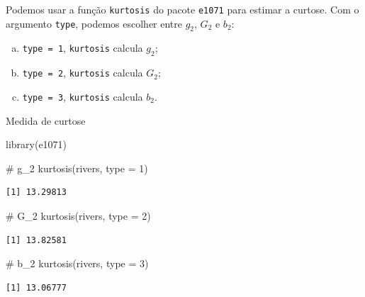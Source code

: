 \documentclass[
  10pt,
  ignorenonframetext,
]{beamer}
\newenvironment{Shaded}{\begin{snugshade}}{\end{snugshade}}
\newcommand{\AttributeTok}[1]{\textcolor[rgb]{0.40,0.45,0.13}{#1}}
\newcommand{\CommentTok}[1]{\textcolor[rgb]{0.37,0.37,0.37}{#1}}
\newcommand{\DecValTok}[1]{\textcolor[rgb]{0.68,0.00,0.00}{#1}}
\newcommand{\FunctionTok}[1]{\textcolor[rgb]{0.28,0.35,0.67}{#1}}
\newcommand{\NormalTok}[1]{\textcolor[rgb]{0.00,0.23,0.31}{#1}}
\providecommand{\tightlist}{%
  \setlength{\itemsep}{0pt}\setlength{\parskip}{0pt}}\usepackage{longtable,booktabs,array}
\begin{document}
\begin{frame}[fragile]
Podemos usar a função \texttt{kurtosis} do pacote \texttt{e1071} para
estimar a curtose. Com o argumento \texttt{type}, podemos escolher entre
\(g_2\), \(G_2\) e \(b_2\):

\begin{enumerate}
[a.]
\tightlist
\item
  \texttt{type\ =\ 1}, \texttt{kurtosis} calcula \(g_2\);
\item
  \texttt{type\ =\ 2}, \texttt{kurtosis} calcula \(G_2\);
\item
  \texttt{type\ =\ 3}, \texttt{kurtosis} calcula \(b_2\).
\end{enumerate}
\end{frame}

\begin{frame}[fragile]{Medida de curtose}
\protect\hypertarget{medida-de-curtose-2}{}
\begin{Shaded}
\begin{Highlighting}[]
\FunctionTok{library}\NormalTok{(e1071)}

\CommentTok{\# g\_2}
\FunctionTok{kurtosis}\NormalTok{(rivers, }\AttributeTok{type =} \DecValTok{1}\NormalTok{)}
\end{Highlighting}
\end{Shaded}

\begin{verbatim}
[1] 13.29813
\end{verbatim}

\begin{Shaded}
\begin{Highlighting}[]
\CommentTok{\# G\_2}
\FunctionTok{kurtosis}\NormalTok{(rivers, }\AttributeTok{type =} \DecValTok{2}\NormalTok{)}
\end{Highlighting}
\end{Shaded}

\begin{verbatim}
[1] 13.82581
\end{verbatim}

\begin{Shaded}
\begin{Highlighting}[]
\CommentTok{\# b\_2}
\FunctionTok{kurtosis}\NormalTok{(rivers, }\AttributeTok{type =} \DecValTok{3}\NormalTok{)}
\end{Highlighting}
\end{Shaded}

\begin{verbatim}
[1] 13.06777
\end{verbatim}
\end{frame}
\end{document}
